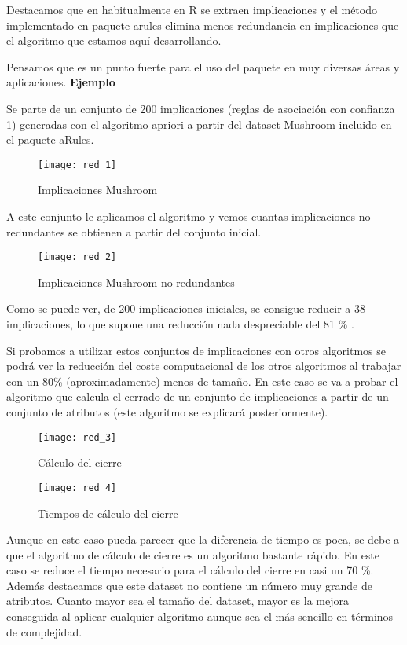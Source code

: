 Destacamos que en habitualmente en R se extraen implicaciones y el m\'etodo implementado en paquete arules elimina menos redundancia en implicaciones que el algoritmo que estamos aqu\'i desarrollando. 

Pensamos que es un punto fuerte para el uso del paquete en muy diversas \'areas y aplicaciones. 
\newpage
\textbf{Ejemplo}

Se parte de un conjunto de 200 implicaciones (reglas de asociaci\'on con confianza 1) generadas con el algoritmo apriori a partir del dataset Mushroom incluido en el paquete aRules.

\begin{figure}[H]
    \centering
    \texttt{[image: red\_1]}
    \caption{Implicaciones Mushroom}
    \label{fig:red_1}
\end{figure} 
\newpage
A este conjunto le aplicamos el algoritmo y vemos cuantas implicaciones no redundantes se obtienen a partir del conjunto inicial.

\begin{figure}[H]
    \centering
    \texttt{[image: red\_2]}
    \caption{Implicaciones Mushroom no redundantes}
    \label{fig:red_2}
\end{figure} 

Como se puede ver, de 200 implicaciones iniciales, se consigue reducir a 38 implicaciones, lo que supone una reducci\'on nada despreciable del 81 \% .

Si probamos a utilizar estos conjuntos de implicaciones con otros algoritmos se podr\'a ver la reducci\'on del coste computacional de los otros algoritmos al trabajar con un 80\% (aproximadamente) menos de tama\~no. En este caso se va a probar el algoritmo que calcula el cerrado de un conjunto de implicaciones a partir de un conjunto de atributos (este algoritmo se explicar\'a posteriormente).

\begin{figure}[H]
    \centering
    \texttt{[image: red\_3]}
    \caption{C\'alculo del cierre}
    \label{fig:red_3}
\end{figure}

\begin{figure}[H]
    \centering
    \texttt{[image: red\_4]}
    \caption{Tiempos de c\'alculo del cierre}
    \label{fig:red_4}
\end{figure}

Aunque en este caso pueda parecer que la diferencia de tiempo es poca, se debe a que el algoritmo de c\'alculo de cierre es un algoritmo bastante r\'apido. En este caso se reduce el tiempo necesario para el c\'alculo del cierre en casi un 70 \%. Adem\'as destacamos que este dataset no contiene un n\'umero muy grande de atributos. Cuanto mayor sea el tama\~no del dataset, mayor es la mejora conseguida al aplicar cualquier algoritmo aunque sea el m\'as sencillo en t\'erminos de complejidad. 

